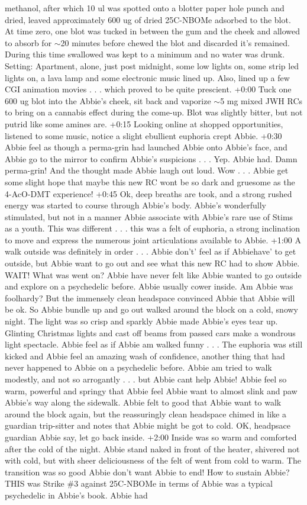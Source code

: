 \documentclass[12pt]{book}
\begin{document}
methanol, after which 10 ul was spotted onto a blotter paper hole punch and dried, leaved approximately 600 ug of dried 25C-NBOMe adsorbed to the blot. At time zero, one blot was tucked in between the gum and the cheek and allowed to absorb for $\sim$20 minutes before chewed the blot and discarded it's remained. During this time swallowed was kept to a minimum and no water was drunk. Setting: Apartment, alone, just post midnight, some low lights on, some strip led lights on, a lava lamp and some electronic music lined up. Also, lined up a few CGI animation movies . . .  which proved to be quite prescient. +0:00 Tuck one 600 ug blot into the Abbie's cheek, sit back and vaporize $\sim$5 mg mixed JWH RCs to bring on a cannabis effect during the come-up. Blot was slightly bitter, but not putrid like some amines are. +0:15 Looking online at shopped opportunities, listened to some music, notice a slight ebullient euphoria crept Abbie. +0:30 Abbie feel as though a perma-grin had launched Abbie onto Abbie's face, and Abbie go to the mirror to confirm Abbie's suspicions . . .  Yep. Abbie had. Damn perma-grin! And the thought made Abbie laugh out loud. Wow . . .  Abbie get some slight hope that maybe this new RC wont be so dark and gruesome as the 4-AcO-DMT experience! +0:45 Ok, deep breaths are took, and a strong rushed energy was started to course through Abbie's body. Abbie's wonderfully stimulated, but not in a manner Abbie associate with Abbie's rare use of Stims as a youth. This was different . . .  this was a felt of euphoria, a strong inclination to move and express the numerous joint articulations available to Abbie. +1:00 A walk outside was definitely in order . . .  Abbie don't' feel as if Abbiehave' to get outside, but Abbie want to go out and see what this new RC had to show Abbie. WAIT! What was went on? Abbie have never felt like Abbie wanted to go outside and explore on a psychedelic before. Abbie usually cower inside. Am Abbie was foolhardy? But the immensely clean headspace convinced Abbie that Abbie will be ok. So Abbie bundle up and go out walked around the block on a cold, snowy night. The light was so crisp and sparkly Abbie made Abbie's eyes tear up. Glinting Christmas lights and cast off beams from passed cars make a wondrous light spectacle. Abbie feel as if Abbie am walked funny . . .  The euphoria was still kicked and Abbie feel an amazing wash of confidence, another thing that had never happened to Abbie on a psychedelic before. Abbie am tried to walk modestly, and not so arrogantly . . .  but Abbie cant help Abbie! Abbie feel so warm, powerful and springy that Abbie feel Abbie want to almost slink and paw Abbie's way along the sidewalk. Abbie felt to good that Abbie want to walk around the block again, but the reassuringly clean headspace chimed in like a guardian trip-sitter and notes that Abbie might be got to cold. OK, headpsace guardian Abbie say, let go back inside. +2:00 Inside was so warm and comforted after the cold of the night. Abbie stand naked in front of the heater, shivered not with cold, but with sheer deliciousness of the felt of went from cold to warm. The transition was so good Abbie don't want Abbie to end! How to sustain Abbie? THIS was Strike \#3 against 25C-NBOMe in terms of Abbie was a typical psychedelic in Abbie's book. Abbie had 
\end{document}
